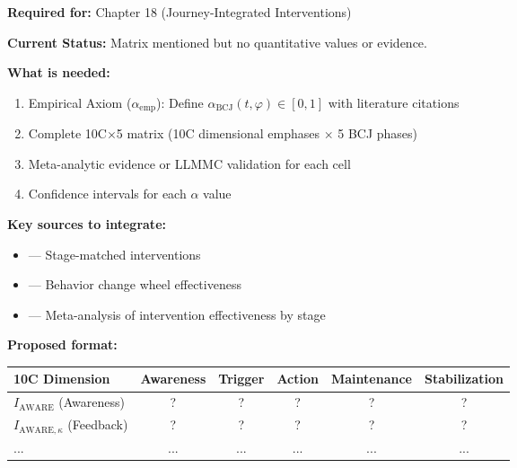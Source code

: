\begin{tcolorbox}[colback=red!5!white, colframe=red!75!black,
    title=\textbf{TODO-UNMAPPED_IE-1: Phase-Type Affinity Matrix $\alpha_{\text{BCJ}}$}]

\textbf{Required for:} Chapter 18 (Journey-Integrated Interventions)

\textbf{Current Status:} Matrix mentioned but no quantitative values or evidence.

\textbf{What is needed:}
\begin{enumerate}[nosep]
    \item Empirical Axiom ($\alpha_{\text{emp}}$): Define $\alpha_{\text{BCJ}}(t, \varphi) \in [0,1]$ with literature citations
    \item Complete 10C$\times$5 matrix (10C dimensional emphases $\times$ 5 BCJ phases)
    \item Meta-analytic evidence or LLMMC validation for each cell
    \item Confidence intervals for each $\alpha$ value
\end{enumerate}

\textbf{Key sources to integrate:}
\begin{itemize}[nosep]
    \item \citet{prochaska1992stages} --- Stage-matched interventions
    \item \citet{michie2011behaviour} --- Behavior change wheel effectiveness
    \item \citet{webb2006does} --- Meta-analysis of intervention effectiveness by stage
\end{itemize}

\textbf{Proposed format:}
\begin{center}
\small
\begin{tabular}{l|ccccc}
10C Dimension & Awareness & Trigger & Action & Maintenance & Stabilization \\
\hline
$I_{\text{AWARE}}$ (Awareness) & ? & ? & ? & ? & ? \\
$I_{\text{AWARE},\kappa}$ (Feedback) & ? & ? & ? & ? & ? \\
... & ... & ... & ... & ... & ... \\
\end{tabular}
\end{center}

\end{tcolorbox}

